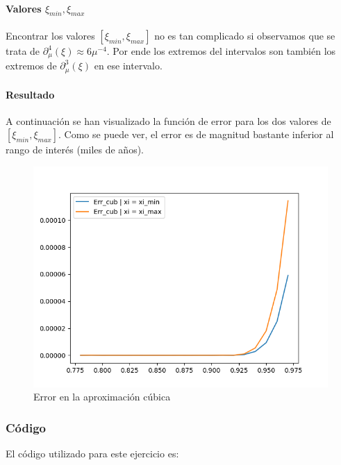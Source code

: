 \paragraph{Valores $\xi_{min}, \xi_{max}$}

Encontrar los valores $[\xi_{min}, \xi_{max}]$ no es tan complicado si observamos que se trata de $\partial_{\mu}^4(\xi) \approx 6\mu^{-4} $. Por ende los extremos del intervalos son también los extremos de $\partial_{\mu}^3(\xi)$ en ese intervalo.

\paragraph{Resultado}

A continuación se han visualizado la función de error para los dos valores de $[\xi_{min}, \xi_{max}]$. Como se puede ver, el error es de magnitud bastante inferior al rango de interés (miles de años).

\begin{figure}[H]
	\includegraphics[width=\linewidth]{figures/figure7.png}
	\caption{Error en la aproximación cúbica}
	\label{fig:err_cub}
\end{figure}


\newpage

\subsubsection{Código}

El código utilizado para este ejercicio es:






